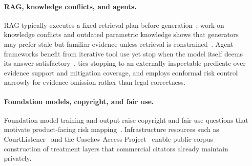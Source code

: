 \paragraph{RAG, knowledge conflicts, and agents.}
RAG typically executes a fixed retrieval plan before generation~\citep{lewis2020retrieval,karpukhin2020dense,gao2023retrieval}; work on knowledge conflicts and outdated parametric knowledge shows that generators may prefer stale but familiar evidence unless retrieval is constrained~\citep{longpre2021entity,chen2022rich,xie2024adaptive}.
Agent frameworks benefit from iterative tool use yet stop when the model itself deems its answer satisfactory~\citep{yao2022react,shinn2023reflexion,wei2022chain,park2023generative,wang2024voyager,wang2024multiagent}.
\sysname{} ties stopping to an externally inspectable predicate over evidence support and mitigation coverage, and employs conformal risk control~\citep{angelopoulos2023conformalrisk,angelopoulos2021ltt,geifman2017selective} narrowly for evidence omission rather than legal correctness.

\paragraph{Foundation models, copyright, and fair use.}
Foundation-model training and output raise copyright and fair-use questions that motivate product-facing risk mapping~\citep{henderson2023foundation,levendowski2018copyright,grimmelmann2015copyright,bommasani2021opportunities}.
Infrastructure resources such as CourtListener~\citep{courtlistener2023} and the Caselaw Access Project~\citep{cap2024} enable public-corpus construction of treatment layers that commercial citators already maintain privately.
